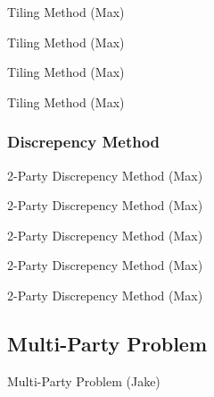 \documentclass{beamer}
\begin{document}
\begin{frame}{Tiling Method (Max)}

\end{frame}

\begin{frame}{Tiling Method (Max)}

\end{frame}

\begin{frame}{Tiling Method (Max)}

\end{frame}

\begin{frame}{Tiling Method (Max)}

\end{frame}

\subsubsection{Discrepency Method}

\begin{frame}{2-Party Discrepency Method (Max)}

\end{frame}

\begin{frame}{2-Party Discrepency Method (Max)}

\end{frame}

\begin{frame}{2-Party Discrepency Method (Max)}

\end{frame}

\begin{frame}{2-Party Discrepency Method (Max)}

\end{frame}

\begin{frame}{2-Party Discrepency Method (Max)}

\end{frame}

\subsection{Multi-Party Problem}

\begin{frame}{Multi-Party Problem (Jake)}

\end{frame}
\end{document}
